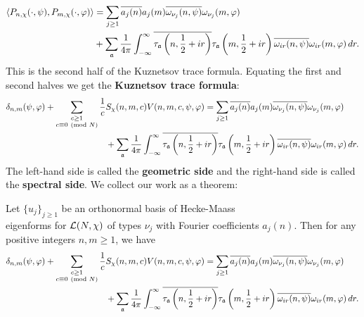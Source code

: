     \begin{align*}
      \langle P_{n,\chi}(\cdot,\psi),P_{m,\chi}(\cdot,\varphi)\rangle &= \sum_{j \ge 1}\overline{a_{j}(n)}a_{j}(m)\overline{\omega_{\nu_{j}}(n,\psi)}\omega_{\nu_{j}}(m,\varphi) \\
      &+\sum_{\mathfrak{a}}\frac{1}{4\pi}\int_{-\infty}^{\infty}\overline{\tau_{\mathfrak{a}}\left(n,\frac{1}{2}+ir\right)}\tau_{\mathfrak{a}}\left(m,\frac{1}{2}+ir\right)\overline{\omega_{ir}(n,\psi)}\omega_{ir}(m,\varphi)\,dr.
    \end{align*}
    This is the second half of the Kuznetsov trace formula. Equating the first and second halves we get the \textbf{Kuznetsov trace formula}:
    \begin{align*}
      \delta_{n,m}(\psi,\varphi)+\sum_{\substack{c \ge 1 \\ c \equiv 0 \ \left(\text{mod }N\right)}}\frac{1}{c}&S_{\chi}(n,m,c)V(n,m,c,\psi,\varphi) = \sum_{j \ge 1}\overline{a_{j}(n)}a_{j}(m)\overline{\omega_{\nu_{j}}(n,\psi)}\omega_{\nu_{j}}(m,\varphi) \\
      &+\sum_{\mathfrak{a}}\frac{1}{4\pi}\int_{-\infty}^{\infty}\overline{\tau_{\mathfrak{a}}\left(n,\frac{1}{2}+ir\right)}\tau_{\mathfrak{a}}\left(m,\frac{1}{2}+ir\right)\overline{\omega_{ir}(n,\psi)}\omega_{ir}(m,\varphi)\,dr.
    \end{align*}
    The left-hand side is called the \textbf{geometric side} and the right-hand side is called the \textbf{spectral side}. We collect our work as a theorem:

    \begin{theorem}
      Let $\{u_{j}\}_{j \ge 1}$ be an orthonormal basis of Hecke-Maass \\ eigenforms for $\mathcal{L}(N,\chi)$ of types $\nu_{j}$ with Fourier coefficients $a_{j}(n)$. Then for any positive integers $n,m \ge 1$, we have
      \begin{align*}
        \delta_{n,m}(\psi,\varphi)+\sum_{\substack{c \ge 1 \\ c \equiv 0 \ \left(\text{mod }N\right)}}\frac{1}{c}&S_{\chi}(n,m,c)V(n,m,c,\psi,\varphi) = \sum_{j \ge 1}\overline{a_{j}(n)}a_{j}(m)\overline{\omega_{\nu_{j}}(n,\psi)}\omega_{\nu_{j}}(m,\varphi) \\
        &+\sum_{\mathfrak{a}}\frac{1}{4\pi}\int_{-\infty}^{\infty}\overline{\tau_{\mathfrak{a}}\left(n,\frac{1}{2}+ir\right)}\tau_{\mathfrak{a}}\left(m,\frac{1}{2}+ir\right)\overline{\omega_{ir}(n,\psi)}\omega_{ir}(m,\varphi)\,dr.
      \end{align*}
    \end{theorem} \fi